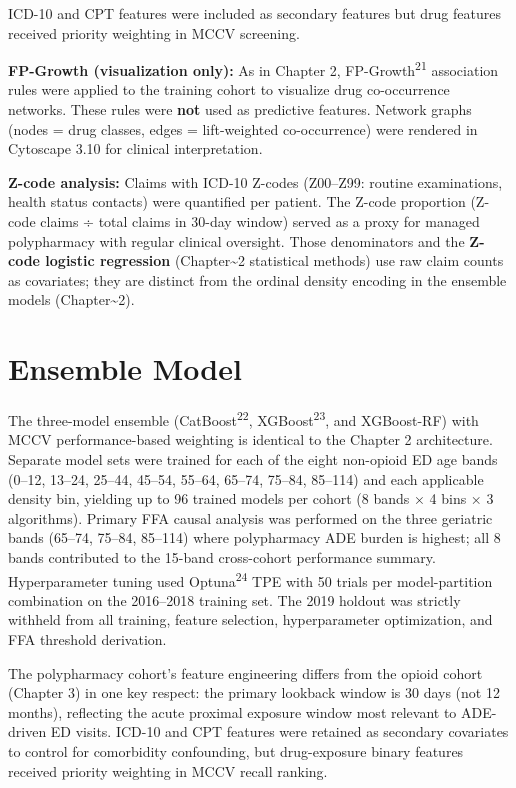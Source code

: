\documentclass[
  12pt,
]{book}
\begin{document}
ICD-10 and CPT features were included as secondary features but drug
features received priority weighting in MCCV screening.

\textbf{FP-Growth (visualization only):} As in Chapter 2,
FP-Growth\textsuperscript{21} association rules were applied to the
training cohort to visualize drug co-occurrence networks. These rules
were \textbf{not} used as predictive features. Network graphs (nodes =
drug classes, edges = lift-weighted co-occurrence) were rendered in
Cytoscape 3.10 for clinical interpretation.

\textbf{Z-code analysis:} Claims with ICD-10 Z-codes (Z00--Z99: routine
examinations, health status contacts) were quantified per patient. The
Z-code proportion (Z-code claims ÷ total claims in 30-day window) served
as a proxy for managed polypharmacy with regular clinical oversight.
Those denominators and the \textbf{Z-code logistic regression}
(Chapter\textasciitilde2 statistical methods) use raw claim counts as
covariates; they are distinct from the ordinal density encoding in the
ensemble models (Chapter\textasciitilde2).

\section{Ensemble Model}\label{sec-model}

The three-model ensemble (CatBoost\textsuperscript{22},
XGBoost\textsuperscript{23}, and XGBoost-RF) with MCCV performance-based
weighting is identical to the Chapter 2 architecture. Separate model
sets were trained for each of the eight non-opioid ED age bands (0--12,
13--24, 25--44, 45--54, 55--64, 65--74, 75--84, 85--114) and each
applicable density bin, yielding up to 96 trained models per cohort (8
bands × 4 bins × 3 algorithms). Primary FFA causal analysis was
performed on the three geriatric bands (65--74, 75--84, 85--114) where
polypharmacy ADE burden is highest; all 8 bands contributed to the
15-band cross-cohort performance summary. Hyperparameter tuning used
Optuna\textsuperscript{24} TPE with 50 trials per model-partition
combination on the 2016--2018 training set. The 2019 holdout was
strictly withheld from all training, feature selection, hyperparameter
optimization, and FFA threshold derivation.

The polypharmacy cohort's feature engineering differs from the opioid
cohort (Chapter 3) in one key respect: the primary lookback window is 30
days (not 12 months), reflecting the acute proximal exposure window most
relevant to ADE-driven ED visits. ICD-10 and CPT features were retained
as secondary covariates to control for comorbidity confounding, but
drug-exposure binary features received priority weighting in MCCV recall
ranking.
\end{document}
